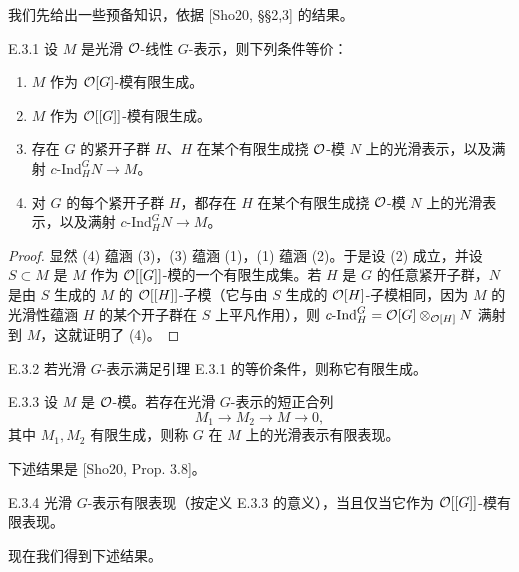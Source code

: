 我们先给出一些预备知识，依据 [Sho20, §§2,3] 的结果。

\begin{lem}{E.3.1}\label{thm:a4-20-15}
设 $M$ 是光滑 $\mathcal{O}$-线性 $G$-表示，则下列条件等价：
\begin{enumerate}[label=(\arabic*)]
\item $M$ 作为 $\mathcal{O}[G]$-模有限生成。
\item $M$ 作为 $\mathcal{O}[[G]]$-模有限生成。
\item 存在 $G$ 的紧开子群 $H$、$H$ 在某个有限生成挠 $\mathcal{O}$-模 $N$ 上的光滑表示，以及满射 $c\text{-}\mathrm{Ind}_H^GN\to M$。
\item 对 $G$ 的每个紧开子群 $H$，都存在 $H$ 在某个有限生成挠 $\mathcal{O}$-模 $N$ 上的光滑表示，以及满射 $c\text{-}\mathrm{Ind}_H^GN\to M$。
\end{enumerate}
\end{lem}

\begin{proof}
显然 (4) 蕴涵 (3)，(3) 蕴涵 (1)，(1) 蕴涵 (2)。于是设 (2) 成立，并设 $S\subset M$ 是 $M$ 作为 $\mathcal{O}[[G]]$-模的一个有限生成集。若 $H$ 是 $G$ 的任意紧开子群，$N$ 是由 $S$ 生成的 $M$ 的 $\mathcal{O}[[H]]$-子模（它与由 $S$ 生成的 $\mathcal{O}[H]$-子模相同，因为 $M$ 的光滑性蕴涵 $H$ 的某个开子群在 $S$ 上平凡作用），则 $c\text{-}\mathrm{Ind}_H^G=\mathcal{O}[G]\otimes_{\mathcal{O}[H]}N$ 满射到 $M$，这就证明了 (4)。
\end{proof}

\begin{defn}{E.3.2}\label{thm:a4-20-16}
若光滑 $G$-表示满足引理 E.3.1 的等价条件，则称它有限生成。
\end{defn}

\begin{defn}{E.3.3}\label{thm:a4-20-17}
设 $M$ 是 $\mathcal{O}$-模。若存在光滑 $G$-表示的短正合列
\[
M_1\to M_2\to M\to0,
\]
其中 $M_1,M_2$ 有限生成，则称 $G$ 在 $M$ 上的光滑表示有限表现。
\end{defn}

下述结果是 [Sho20, Prop. 3.8]。

\begin{lem}{E.3.4}\label{thm:a4-20-18}
光滑 $G$-表示有限表现（按定义 E.3.3 的意义），当且仅当它作为 $\mathcal{O}[[G]]$-模有限表现。
\end{lem}

现在我们得到下述结果。

